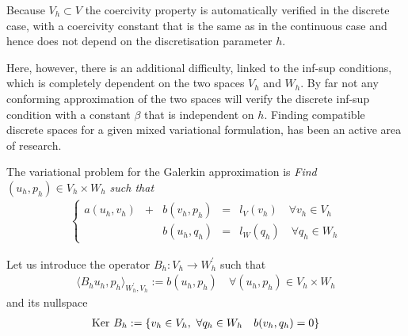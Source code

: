 Because $V_h\subset V$ the coercivity property is automatically verified in the discrete case, with a coercivity constant that is the same as in the continuous case and hence does not depend on the discretisation parameter $h$.

Here, however, there is an additional difficulty, linked to the inf-sup conditions, which is completely dependent on the two spaces $V_h$ and $W_h$. By far not any conforming approximation of the two spaces will verify the discrete inf-sup condition with a constant $\beta$ that is independent on $h$. Finding compatible discrete spaces for a given mixed variational formulation, has been an active area of research. 

The variational problem for the Galerkin approximation is {\em Find $(u_h,p_h)\in V_h\times W_h$ such that}
\begin{align}
  \left\{ 
  \begin{array}{cccccc}
    a(u_h,v_h) & + & b(v_h,p_h) &=& l_V(v_h) \quad \forall v_h \in V_h \\
               &   & b(u_h,q_h) &=& l_W(q_h) \quad \forall q_h \in W_h 
  \end{array} \right.
  \label{eq:abs_var_mixed_galerkin}
\end{align}



Let us introduce the operator $B_h: V_h \rightarrow W_h^\prime$ such that
\begin{align}
  \langle B_h u_h, p_h \rangle_{W_h^\prime, V_h} := b(u_h,p_h) \quad \forall (u_h,p_h) \in V_h \times W_h 
\end{align}
and its nullspace
\begin{align}
  \mbox{Ker}~ B_h := \{ v_h \in V_h, ~\forall q_h \in W_h \quad b(v_h,q_h) = 0 \}  
\end{align}

